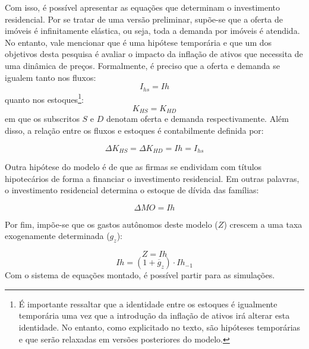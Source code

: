 Com isso, é possível apresentar as equações que determinam o investimento residencial. Por se tratar de uma versão preliminar, supõe-se que a oferta de imóveis é infinitamente elástica, ou seja, toda a demanda por imóveis é atendida. No entanto, vale mencionar que é uma hipótese temporária e que um dos objetivos desta pesquisa é avaliar o impacto da inflação de ativos que necessita de uma dinâmica de preços. Formalmente, é preciso que a oferta e demanda se igualem tanto nos fluxos:
\begin{equation}
    I_{hs} = Ih
\end{equation}
quanto nos estoques\footnote{É importante ressaltar que a identidade entre os estoques é igualmente temporária uma vez que a introdução da inflação de ativos irá alterar esta identidade. No entanto, como explicitado no texto, são hipóteses temporárias e que serão relaxadas em versões posteriores do modelo.}:
\begin{equation}
    K_{HS} = K_{HD}
\end{equation}
em que os subscritos $S$ e $D$ denotam oferta e demanda respectivamente. Além disso, a relação entre os fluxos e estoques é contabilmente definida por:

\begin{equation}
    \Delta K_{HS} = \Delta K_{HD} = Ih = I_{hs}
\end{equation}

Outra hipótese do modelo é de que as firmas se endividam com títulos hipotecários de forma a financiar o investimento residencial. Em outras palavras, o investimento residencial determina o estoque de dívida das famílias:

\begin{equation}
    \label{EqMO}
    \Delta MO = Ih
\end{equation}

Por fim, impõe-se que os gastos autônomos deste modelo ($Z$) crescem a uma taxa exogenamente determinada ($g_z$):

\begin{equation}
\label{_Z}
    Z = Ih
\end{equation}
\begin{equation}
    Ih = (1 + \overline g_z)\cdot Ih_{-1}
\end{equation}
Com o sistema de equações montado, é possível partir para as simulações.

